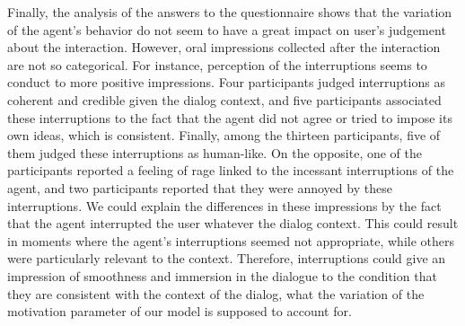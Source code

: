 Finally, the analysis of the answers to the questionnaire shows that the variation of the agent's behavior do not seem to have a great impact on user's judgement about the interaction. 
However, oral impressions collected after the interaction are not so categorical.   
For instance, perception of the interruptions seems to conduct to more positive impressions. Four participants judged interruptions as coherent and credible given the dialog context, and five participants associated these interruptions to the fact that the agent did not agree or tried to impose its own ideas, which is consistent. 
Finally, among the thirteen participants, five of them judged these interruptions as human-like. On the opposite, one of the participants reported a feeling of rage linked to the incessant interruptions of the agent, and two participants reported that they were annoyed by these interruptions. We could explain the differences in these impressions by the fact that the agent interrupted the user whatever the dialog context. This could result in moments where the agent's interruptions seemed not appropriate, while others were particularly relevant to the context. Therefore, interruptions could give an impression of smoothness and immersion in the dialogue to the condition that they are consistent with the context of the dialog, what the variation of the motivation parameter of our model is supposed to account for.

